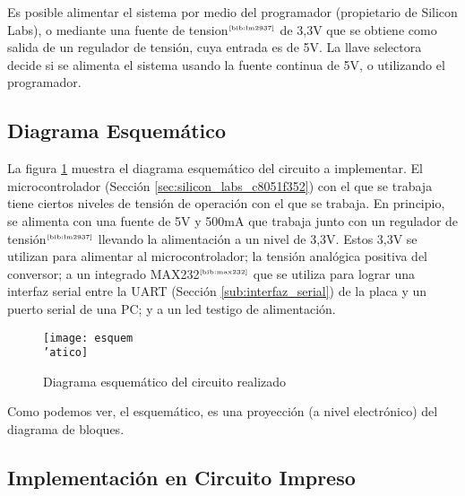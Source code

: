 Es posible alimentar el sistema por medio del programador (propietario de Silicon Labs), o mediante una fuente de tension$^{\tiny{\cite{bib:lm2937}}}$ de 3,3V que se obtiene como salida de un regulador de tensi\'on, cuya entrada es de 5V. La llave selectora decide si se alimenta el sistema usando la fuente continua de 5V, o utilizando el programador.




\subsection{Diagrama Esquem\'atico} %
\label{sub:diagrama_esquematico}

La figura \ref{fig:esquematico} muestra el diagrama esquem\'atico del circuito a implementar. El microcontrolador (Secci\'on \ref{sec:silicon_labs_c8051f352}) con el que se trabaja tiene ciertos niveles de tensi\'on de operaci\'on con el que se trabaja. En principio, se alimenta con una fuente de 5V y 500mA que trabaja junto con un regulador de tensi\'on$^{\tiny{\cite{bib:lm2937}}}$ llevando la alimentaci\'on a un nivel de 3,3V. Estos 3,3V se utilizan para alimentar al microcontrolador; la tensi\'on anal\'ogica positiva del conversor; a un integrado MAX232$^{\tiny{\cite{bib:max232}}}$ que se utiliza para lograr una interfaz serial entre la UART (Secci\'on \ref{sub:interfaz_serial}) de la placa y un puerto serial de una PC; y a un led testigo de alimentaci\'on.

\begin{figure}[H]
  \centering
  \texttt{[image: esquem\\'atico]}
  \caption{\small Diagrama esquem\'atico del circuito realizado}\label{fig:esquematico}
\end{figure}

Como podemos ver, el esquem\'atico, es una proyecci\'on (a nivel electr\'onico) del diagrama de bloques. %


\subsection{Implementaci\'on en Circuito Impreso} %
\label{sub:implementacion_en_circuito_impreso}

